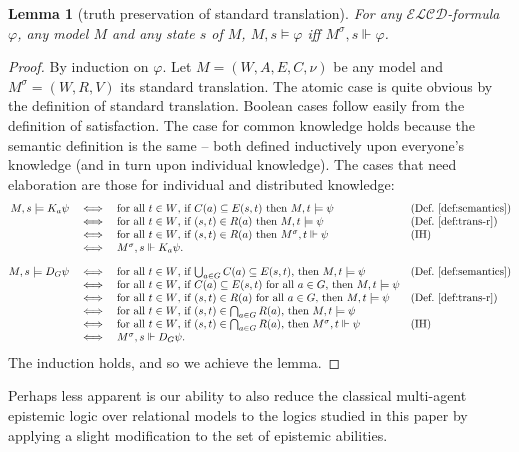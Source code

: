 \documentclass{article}
\newtheorem{lemma}[theorem]{Lemma}%
\newcommand{\ab}{\ensuremath{A}\xspace}
\renewcommand{\phi}{\varphi}
\newcommand{\langcd}{\ensuremath{\mathcal{ELCD}}\xspace}
\begin{document}
\begin{lemma}[truth preservation of standard translation]\label{lem:trans-r}
For any \langcd-formula $\phi$, any model $M$ and any state $s$ of $M$, $M,s \models \phi$ iff $M^\sigma,s \Vdash \phi$.
\end{lemma}
\begin{proof}
By induction on $\phi$. Let $M=(W,\ab,E,C,\nu)$ be any model and $M^\sigma = (W, R, V)$ its standard translation. The atomic case is quite obvious by the definition of standard translation. Boolean cases follow easily from the definition of satisfaction. The case for common knowledge holds because the semantic definition is the same -- both defined inductively upon everyone's knowledge (and in turn upon individual knowledge). The cases that need elaboration are those for individual and distributed knowledge:
$$\begin{array}{@{}rcll@{}}
M,s \models K_a \psi & \iff & \text{for all $t \in W$, if $C(a) \subseteq E(s,t)$ then $M,t \models \psi$} &\text{(Def.~\ref{def:semantics})}\\
& \iff & \text{for all $t \in W$, if $(s,t) \in R(a)$ then $M,t \models \psi$} &\text{(Def.~\ref{def:trans-r})}\\
& \iff & \text{for all $t \in W$, if $(s,t) \in R(a)$ then $M^\sigma,t \Vdash \psi$} & \text{(IH)}\\
& \iff & M^\sigma,s \Vdash K_a\psi. &\\[1em]
%
M,s \models D_G \psi & \iff & \text{for all $t\in W$, if $\bigcup_{a\in G}C(a) \subseteq E(s,t)$, then $M,t \models \psi$} &\text{(Def.~\ref{def:semantics})}\\
& \iff & \text{for all $t\in W$, if $C(a)\subseteq E(s,t)$ for all $a\in G$, then $M,t \models \psi$} & \\
& \iff & \text{for all $t\in W$, if $(s,t) \in R(a)$ for all $a\in G$, then $M,t \models \psi$} &\text{(Def.~\ref{def:trans-r})}\\
& \iff & \text{for all $t\in W$, if $(s,t) \in \bigcap_{a \in G} R(a)$, then $M,t \models \psi$} & \\
& \iff & \text{for all $t\in W$, if $(s,t) \in \bigcap_{a \in G} R(a)$, then $M^\sigma,t \Vdash \psi$} & \text{(IH)}\\
& \iff & M^\sigma,s \Vdash D_G\psi. &\\
\end{array}
$$
The induction holds, and so we achieve the lemma.
\end{proof}

Perhaps less apparent is our ability to also reduce the classical multi-agent epistemic logic over relational models to the logics studied in this paper by applying a slight modification to the set of epistemic abilities.
\end{document}
